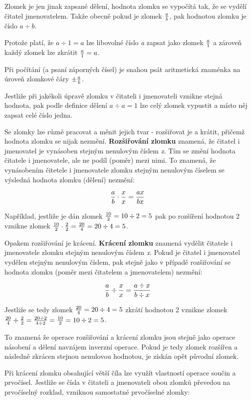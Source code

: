 Zlomek je jen jinak zapsané dělení, hodnota zlomku se vypočítá tak, že se vydělí čitatel jmenovatelem. Takže obecně pokud je zlomek $a\over b$, pak hodnotou zlomku je číslo $a \div b$.

Protože platí, že $ a \div 1 = a $ lze libovolné číslo {\it a} zapsat jako zlomek $a \over 1$ a zároveň každý zlomek lze zkrátit ${a\over 1} = a$.

Při počítání (a psaní záporných čísel) je snahou psát aritmetická znaménka na úroveň zlomkové čáry $\pm {a\over b}$.

Jestliže při jakékoli úpravě zlomku v čitateli i jmenovateli vznikne stejná hodnota, pak podle definice dělení $a \div a = 1$ lze celý zlomek vypustit a místo něj zapsat celé číslo jedna.


Se zlomky lze různě pracovat a měnit jejich tvar - rozšiřovat je a krátit, přičemž hodnota zlomku se nijak nezmění.
{\bf Rozšiřování zlomku} znamená, že čitatel i jmenovatel je vynásoben stejným nenulovým číslem {\it x}. Tím se změní hodnota čitatele i jmenovatele, ale ne podíl (poměr) mezi nimi. To znamená, že vynásobením čitetele i jmenovatele zlomku stejným nenulovým číselem se výsledná hodnota zlomku (dělení) nezmění:

$$ {a\over b} \cdot {x\over x} = {ax \over bx} $$

Například, jestliže je dán zlomek ${10 \over 2} = 10 \div 2 = 5$ pak po rozšíření hodnotou 2 vznikne zlomek ${10\over 2}\cdot {2\over 2} = {20\over 4} = 20\div 4 = 5$.

Opakem rozšiřování je krácení. {\bf Krácení zlomku} znamená vydělit čitatele i jmenovatele zlomku stejným nenulovým číslem {\it x}. Pokud je čitatel i jmenovatel vydělen stejným nenulovým číslem, pak stejně jako v případě rozšiřování se hodnota zlomku (poměr mezi čitatelem a jmenovatelem) nezmění:

$${a\over b}\div {x\over x} = {a\div x \over b\div x}$$

Jestliže se tedy zlomek ${20\over 4} = 20 \div 4 = 5$ zkrátí hodnotou 2 vznikne zlomek ${20\over 4} \div {2\over 2} = {{20\div 2} \over 4\div 2} = {10\over 2} = 10 \div 2= 5$.

To znamená že operace rozšiřování a krácení zlomku jsou stejně jako operace násobení a dělení navzájem inverzní operace. Pokud je tedy zlomek rozšířen a následně zkrácen stejnou nenulovou hodnotou, je získán opět původní zlomek.

Při krácení zlomku obsahující větší číla lze využít vlastností operace součin a prvočísel. Jestliže se čísla v čitateli a jmenovateli obou zlomků převedou na prvočíselný rozklad, vzniknou samostatné prvočíselné zlomky:

